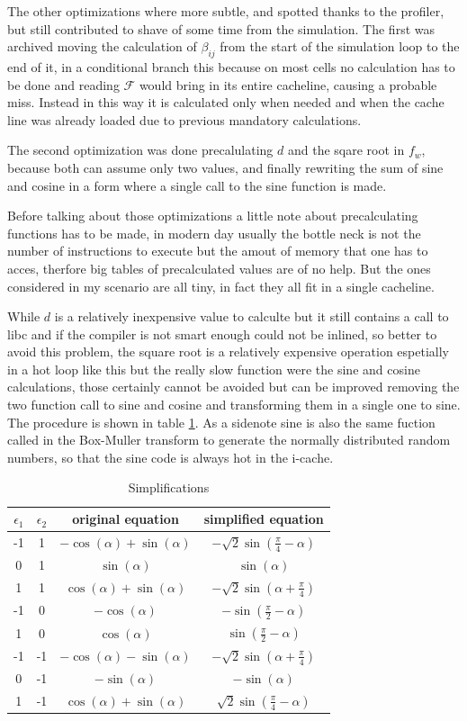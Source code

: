 \documentclass[Lau]{sapthesis} %
\begin{document}
The other optimizations where more subtle, and spotted thanks to the profiler,
but still contributed to shave of some time from the simulation. The first was
archived moving the calculation of $\beta_{ij}$ from the start of the simulation
loop to the end of it, in a conditional branch this because on most cells no
calculation has to be done and reading $\mathcal{F}$ would bring in its entire
cacheline, causing a probable miss.  Instead in this way it is calculated only
when needed and when the cache line was already loaded due to previous mandatory
calculations.

The second optimization was done precalulating $d$ and the sqare root in $f_w$,
because both can assume only two values, and finally rewriting the sum of sine
and cosine in a form where a single call to the sine function is made.

Before talking about those optimizations a little note about precalculating
functions has to be made, in modern day usually the bottle neck is not the
number of instructions to execute but the amout of memory that one has to acces,
therfore big tables of precalculated values are of no help.  But the ones
considered in my scenario are all tiny, in fact they all fit in a single
cacheline.

While $d$ is a relatively inexpensive value to calculte but it still contains a
call to libc and if the compiler is not smart enough could not be inlined, so
better to avoid this problem, the square root is a relatively expensive
operation espetially in a hot loop like this but the really slow function were
the sine and cosine calculations, those certainly cannot be avoided but can be
improved removing the two function call to sine and cosine and transforming them
in a single one to sine. The procedure is shown in table
\ref{tab:simplifications}. As a sidenote sine is also the same fuction called in
the Box-Muller transform to generate the normally distributed random numbers, so
that the sine code is always hot in the i-cache.

\begin{table}
\centering
\begin{tabular}{c c | c | c}
$\epsilon_1$ & $\epsilon_2$ & original equation & simplified equation\\
\hline
-1 & 1 & $-\cos(\alpha)+\sin(\alpha)$ & $-\sqrt{2}\sin(\frac{\pi}{4}-\alpha)$\\
0 & 1 & $\sin(\alpha)$ & $\sin(\alpha)$\\
1 & 1 & $\cos(\alpha) + \sin(\alpha)$ & $-\sqrt{2}\sin(\alpha+\frac{\pi}{4})$\\
-1 & 0 & $-\cos(\alpha)$ & $-\sin(\frac{\pi}{2}-\alpha)$\\
1 & 0 & $\cos(\alpha)$ & $\sin(\frac{\pi}{2}-\alpha)$\\
-1 & -1 & $-\cos(\alpha)-\sin(\alpha)$ & $-\sqrt{2}\sin(\alpha+\frac{\pi}{4})$\\
0 & -1 & $-\sin(\alpha)$ & $-\sin(\alpha)$\\
1 & -1 & $\cos(\alpha) + \sin(\alpha)$ & $\sqrt{2}\sin(\frac{\pi}{4}-\alpha)$\\
\end{tabular}
\caption{Simplifications}
\label{tab:simplifications}
\end{table}
\end{document}
